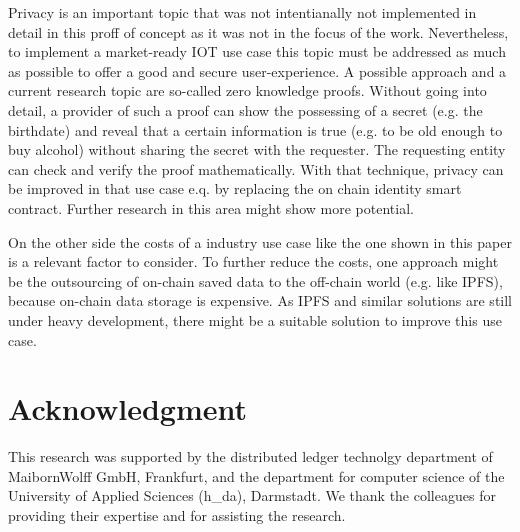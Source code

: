 \documentclass[conference]{IEEEtran}
\begin{document}
Privacy is an important topic that was not intentianally not implemented in detail in this proff of concept as it was not in the focus of the work. Nevertheless, to implement a market-ready IOT use case this topic must be addressed as much as possible to offer a good and secure user-experience. A possible approach and a current research topic are so-called zero knowledge proofs. Without going into detail, a provider of such a proof can show the possessing of a secret (e.g. the birthdate) and reveal that a certain information is true (e.g. to be old enough to buy alcohol) without sharing the secret with the requester. The requesting entity can check and verify the proof mathematically. With that technique, privacy can be improved in that use case e.q. by replacing the on chain identity smart contract. Further research in this area might show more potential.

On the other side the costs of a industry use case like the one shown in this paper is a relevant factor to consider. To further reduce the costs, one approach might be the outsourcing of on-chain saved data to the off-chain world (e.g. like IPFS), because on-chain data storage is expensive. As IPFS and similar solutions are still under heavy development, there might be a suitable solution to improve this use case.


\section*{Acknowledgment}
This research was supported by the distributed ledger technolgy department of MaibornWolff GmbH, Frankfurt, and the department for computer science of the University of Applied Sciences (h\_da), Darmstadt. We thank the colleagues for providing their expertise and for assisting the research.





\end{document}
